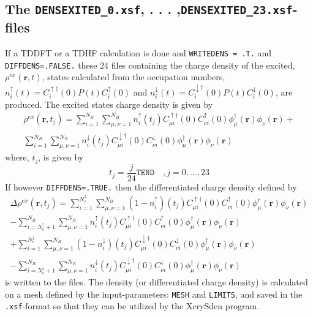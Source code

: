 \documentclass[a4paper,twoside,openany]{book}
\begin{document}
{{\subsection{The \texttt{DENSEXITED\_0.xsf}, . . . ,\texttt{DENSEXITED\_23.xsf}-files}
If a TDDFT or a TDHF calculation is done and \texttt{WRITEDENS = .T.} and  \texttt{DIFFDENS=.FALSE.} these 24 files containing  the charge density of the excited, $\rho^{ex}(\mathbf{r},t)$, states calculated from the occupation numbers, $n^{\uparrow}_{i}(t) = C_{i}^{\uparrow \dagger}(0)P(t)C_{i}^{\uparrow}(0)$ and $n^{\downarrow }_{i}(t) = C_{i}^{\downarrow \dagger}(0)P(t)C_{i}^{\downarrow}(0)$, are produced. The excited states charge density is given by 
\begin{eqnarray}
\rho^{ex}(\mathbf{r},t_{j}) = \sum_{i=1}^{N_{B}}\sum_{\mu,\nu=1}^{N_{B}}n^{\uparrow}_{i}(t_{j})C_{\mu i}^{\uparrow \dagger}(0)C_{\nu i}^{\uparrow}(0)\phi_{\mu}^{\dagger}(\mathbf{r})\phi_{\nu}(\mathbf{r}) +  \nonumber \\
\sum_{i=1}^{N_{B}}\sum_{\mu,\nu=1}^{N_{B}}n^{\downarrow}_{i}(t_{j})C_{\mu i}^{\downarrow \dagger}(0)C_{\nu i}^{\downarrow}(0)\phi_{\mu}^{\dagger}(\mathbf{r})\phi_{\nu}(\mathbf{r})
\end{eqnarray}
where, $t_{j}$, is given by
\begin{equation}
t_{j} = \frac{j}{24}\texttt{TEND}\quad,j=0,\ldots, 23 
\end{equation}
If however \texttt{DIFFDENS=.TRUE.} then the differentiated charge density defined by 
\begin{eqnarray}
\Delta \rho^{ex}(\mathbf{r},t_{j}) = \sum_{i=1}^{N_{e}^{\uparrow}}\sum_{\mu,\nu=1}^{N_{B}}(1-n^{\uparrow}_{i})(t_{j})C_{\mu i}^{\uparrow \dagger}(0)C_{\nu i}^{\uparrow}(0)\phi_{\mu}^{\dagger}(\mathbf{r})\phi_{\nu}(\mathbf{r})   \nonumber \\
-\sum_{i=N_{e}^{\uparrow}+1}^{N_{B}}\sum_{\mu,\nu=1}^{N_{B}}n^{\uparrow}_{i}(t_{j})C_{\mu i}^{\uparrow \dagger}(0)C_{\nu i}^{\uparrow}(0)\phi_{\mu}^{\dagger}(\mathbf{r})\phi_{\nu}(\mathbf{r})   \nonumber \\
+\sum_{i=1}^{N_{e}^{\downarrow}}\sum_{\mu,\nu=1}^{N_{B}}(1-n^{\downarrow}_{i})(t_{j})C_{\mu i}^{\downarrow \dagger}(0)C_{\nu i}^{\downarrow}(0)\phi_{\mu}^{\dagger}(\mathbf{r})\phi_{\nu}(\mathbf{r})  \nonumber \\
-\sum_{i=N_{e}^{\downarrow}+1}^{N_{B}}\sum_{\mu,\nu=1}^{N_{B}}n^{\downarrow}_{i}(t_{j})C_{\mu i}^{\downarrow \dagger}(0)C_{\nu i}^{\downarrow}(0)\phi_{\mu}^{\dagger}(\mathbf{r})\phi_{\nu}(\mathbf{r})
\end{eqnarray}
is written to the files. The density (or differentiated charge density) is calculated on a mesh defined by the input-parameters: \texttt{MESH} and \texttt{LIMITS}, and saved in the \texttt{.xsf}-format so that they can be utilized by the XcrySden program.

}}
\end{document}
